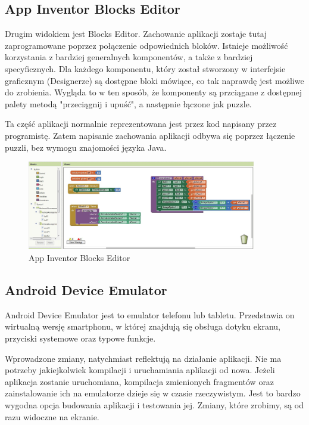 \subsection{App Inventor Blocks Editor}
\label{c222}

Drugim widokiem jest Blocks Editor. Zachowanie aplikacji zostaje tutaj zaprogramowane poprzez połączenie odpowiednich bloków. Istnieje możliwość korzystania z bardziej generalnych komponentów, a także z bardziej specyficznych. Dla każdego komponentu, który został stworzony w interfejsie graficznym (Designerze) są dostępne bloki mówiące, co tak naprawdę jest możliwe do zrobienia. Wygląda to w ten sposób, że komponenty są przciągane z dostępnej palety metodą "przeciągnij i upuść", a następnie łączone jak puzzle.

Ta część aplikacji normalnie reprezentowana jest przez kod napisany przez programistę. Zatem napisanie zachowania aplikacji odbywa się poprzez łączenie puzzli, bez wymogu znajomości języka Java.

\begin{figure}[th] 
\centering\includegraphics[width=10cm]{figures/editor}
\caption{App Inventor Blocks Editor}
\end{figure}

\subsection{Android Device Emulator}
\label{c223}

Android Device Emulator jest to emulator telefonu lub tabletu. Przedstawia on wirtualną wersję smartphonu, w której znajdują się obsługa dotyku ekranu, przyciski systemowe oraz typowe funkcje.

Wprowadzone zmiany, natychmiast reflektują na działanie aplikacji. Nie ma potrzeby jakiejkolwiek kompilacji i uruchamiania aplikacji od nowa. Jeżeli aplikacja zostanie uruchomiana, kompilacja zmienionych fragmentów oraz zainstalowanie ich na emulatorze dzieje się w czasie rzeczywistym. Jest to bardzo wygodna opcja budowania aplikacji i testowania jej. Zmiany, które zrobimy, są od razu widoczne na ekranie.

